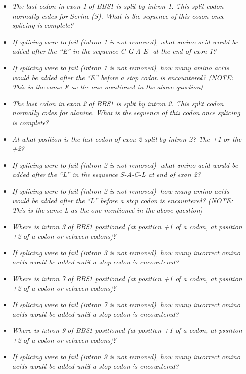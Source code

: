 \documentclass[
]{book}
\providecommand{\tightlist}{%
  \setlength{\itemsep}{0pt}\setlength{\parskip}{0pt}}
\begin{document}
\begin{itemize}
\tightlist
\item
  \emph{The last codon in exon 1 of BBS1 is split by intron 1. This split codon normally codes for Serine (S). What is the sequence of this codon once splicing is complete?}
\item
  \emph{If splicing were to fail (intron 1 is not removed), what amino acid would be added after the ``E'' in the sequence C-G-A-E- at the end of exon 1?}
\item
  \emph{If splicing were to fail (intron 1 is not removed), how many amino acids would be added after the ``E'' before a stop codon is encountered? (NOTE: This is the same E as the one mentioned in the above question)}
\item
  \emph{The last codon in exon 2 of BBS1 is split by intron 2. This split codon normally codes for alanine. What is the sequence of this codon once splicing is complete?}
\item
  \emph{At what position is the last codon of exon 2 split by intron 2? The +1 or the +2?}
\item
  \emph{If splicing were to fail (intron 2 is not removed), what amino acid would be added after the ``L'' in the sequence S-A-C-L at end of exon 2?}
\item
  \emph{If splicing were to fail (intron 2 is not removed), how many amino acids would be added after the ``L'' before a stop codon is encountered? (NOTE: This is the same L as the one mentioned in the above question)}
\item
  \emph{Where is intron 3 of BBS1 positioned (at position +1 of a codon, at position +2 of a codon or between codons)?}
\item
  \emph{If splicing were to fail (intron 3 is not removed), how many incorrect amino acids would be added until a stop codon is encountered?}
\item
  \emph{Where is intron 7 of BBS1 positioned (at position +1 of a codon, at position +2 of a codon or between codons)?}
\item
  \emph{If splicing were to fail (intron 7 is not removed), how many incorrect amino acids would be added until a stop codon is encountered?}
\item
  \emph{Where is intron 9 of BBS1 positioned (at position +1 of a codon, at position +2 of a codon or between codons)?}
\item
  \emph{If splicing were to fail (intron 9 is not removed), how many incorrect amino acids would be added until a stop codon is encountered?}
\end{itemize}
\end{document}
